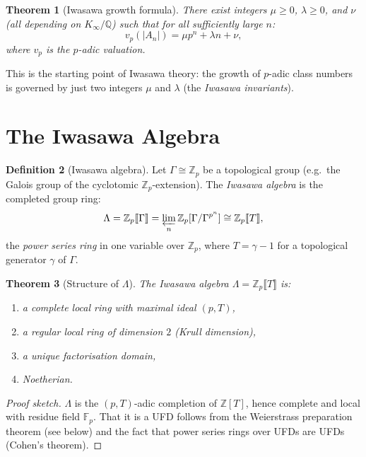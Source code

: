 \documentclass[12pt,a4paper]{amsart}
\newtheorem{theorem}{Theorem}[section]
\theoremstyle{definition}
\newtheorem{definition}[theorem]{Definition}
\newcommand{\Z}{\mathbb{Z}}
\newcommand{\Q}{\mathbb{Q}}
\newcommand{\F}{\mathbb{F}}
\newcommand{\Zp}{\mathbb{Z}_p}
\begin{document}
\begin{theorem}[Iwasawa growth formula]
\label{thm:growth}
There exist integers $\mu \ge 0$, $\lambda \ge 0$, and $\nu$ (all depending
on $K_\infty/\Q$) such that for all sufficiently large $n$:
\[
  v_p(|A_n|) = \mu p^n + \lambda n + \nu,
\]
where $v_p$ is the $p$-adic valuation.
\end{theorem}

This is the starting point of Iwasawa theory: the growth of $p$-adic class
numbers is governed by just two integers $\mu$ and $\lambda$ (the \emph{Iwasawa invariants}).

\section{The Iwasawa Algebra}

\begin{definition}[Iwasawa algebra]
\label{def:iwasawa_algebra}
Let $\Gamma \cong \Zp$ be a topological group (e.g.\ the Galois group of
the cyclotomic $\Zp$-extension).  The \emph{Iwasawa algebra} is the
completed group ring:
\[
  \Lambda = \Zp\llbracket\Gamma\rrbracket
  = \varprojlim_n \Zp[\Gamma/\Gamma^{p^n}]
  \cong \Zp\llbracket T \rrbracket,
\]
the \emph{power series ring} in one variable over $\Zp$, where
$T = \gamma - 1$ for a topological generator $\gamma$ of $\Gamma$.
\end{definition}

\begin{theorem}[Structure of $\Lambda$]
\label{thm:lambda_structure}
The Iwasawa algebra $\Lambda = \Zp\llbracket T \rrbracket$ is:
\begin{enumerate}[label=(\roman*)]
  \item a \emph{complete local ring} with maximal ideal $(p, T)$,
  \item a \emph{regular local ring} of dimension $2$ (Krull dimension),
  \item a \emph{unique factorisation domain},
  \item \emph{Noetherian}.
\end{enumerate}
\end{theorem}

\begin{proof}[Proof sketch]
$\Lambda$ is the $(p, T)$-adic completion of $\Z[T]$, hence complete and
local with residue field $\F_p$.  That it is a UFD follows from the Weierstrass
preparation theorem (see below) and the fact that power series rings over UFDs
are UFDs (Cohen's theorem).
\end{proof}
\end{document}
